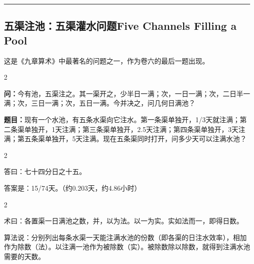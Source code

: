 \documentclass[11pt,a4paper]{article}
\newcommand{\longline}{\noindent\rule{\textwidth}{0.4pt}}
\newcommand{\bilingualsubsection}[2]{%
  \subsection{#1\hfill\normalfont\normalsize\color{sectioncolor}#2}%
}
\begin{document}
\vspace{0.5cm}
\longline
\vspace{0.3cm}

\bilingualsubsection{五渠注池：五渠灌水问题}{Five Channels Filling a Pool}

这是《九章算术》中最著名的问题之一，作为卷六的最后一题出现。

\begin{paracol}{2}

\begin{problembox}
\textbf{问：}今有池，五渠注之。其一渠开之，少半日一满；次，一日一满；次，二日半一满；次，三日一满；次，五日一满。今并决之，问几何日满池？
\end{problembox}

\switchcolumn

\begin{problembox}
\textbf{题目：}现有一个水池，有五条水渠向它注水。第一条渠单独开，1/3天就注满；第二条渠单独开，1天注满；第三条渠单独开，2.5天注满；第四条渠单独开，3天注满；第五条渠单独开，5天注满。现在五条渠同时打开，问多少天可以注满水池？
\end{problembox}

\end{paracol}

\vspace{0.2cm}

\begin{paracol}{2}

\begin{answerbox}[\CJKfamily{rm}答 · 原文]
答曰：七十四分日之十五。
\end{answerbox}

\switchcolumn

\begin{answerbox}[白话文：答案]
答案是：15/74天。（约0.203天，约4.86小时）
\end{answerbox}

\end{paracol}

\vspace{0.2cm}

\begin{paracol}{2}

\begin{methodbox}[\CJKfamily{rm}术 · 原文]
术曰：各置渠一日满池之数，并，以为法。以一为实。实如法而一，即得日数。
\end{methodbox}

\switchcolumn

\begin{methodbox}
算法说：分别列出每条水渠一天能注满水池的份数（即各渠的日注水效率），相加作为除数（法）。以注满一池作为被除数（实）。被除数除以除数，就得到注满水池需要的天数。
\end{methodbox}

\end{paracol}
\end{document}

